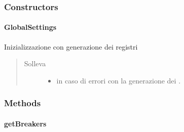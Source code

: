 \documentclass[letterpaper,10pt,italian,openany,oneside]{sphinxmanual}
\begin{document}
\subsubsection{Constructors}
\label{\detokenize{test/it/unicam/cs/pa/mastermind/gamecore/GlobalSettings:constructors}}

\paragraph{GlobalSettings}
\label{\detokenize{test/it/unicam/cs/pa/mastermind/gamecore/GlobalSettings:id1}}

\begin{fulllineitems}
\label{\detokenize{test/it/unicam/cs/pa/mastermind/gamecore/GlobalSettings:it.unicam.cs.pa.mastermind.gamecore.GlobalSettings.GlobalSettings()}}
Inizializzazione con generazione dei registri
\begin{quote}\begin{description}
\item[{Solleva}] \leavevmode\begin{itemize}
\item {} 
 \textendash{} in caso di errori con la generazione dei .

\end{itemize}

\end{description}\end{quote}

\end{fulllineitems}



\subsubsection{Methods}
\label{\detokenize{test/it/unicam/cs/pa/mastermind/gamecore/GlobalSettings:methods}}

\paragraph{getBreakers}
\label{\detokenize{test/it/unicam/cs/pa/mastermind/gamecore/GlobalSettings:getbreakers}}
\end{document}
